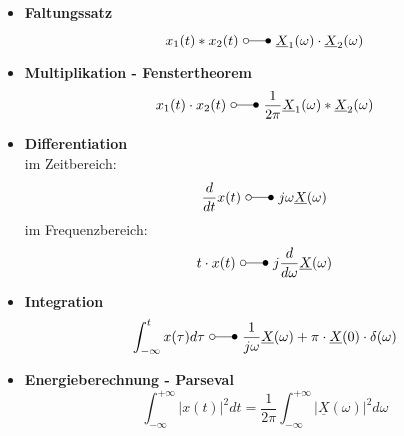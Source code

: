 \begin{mdframed}[style=exercise,nobreak=false]
\begin{itemize}
		\item \textbf{Faltungssatz}
		      \[
			      x_{1}(t) * x_{2}(t)\ \laplace\ \underline{X}_{1}(\omega) \cdot \underline{X}_{2}(\omega)
		      \]
		\item \textbf{Multiplikation - Fenstertheorem}
		      \[
			      x_{1}(t) \cdot x_{2}(t)\ \laplace\ \frac{1}{2 \pi} \underline{X}_{1}(\omega) * \underline{X}_{2}(\omega)
		      \]
		\item \textbf{Differentiation\\}
		      {\small im Zeitbereich:}
		      \[
			      \frac{d}{dt} x(t) \ \laplace\ j\omega\underline{X}(\omega)
		      \]
		      {\small im Frequenzbereich:}
		      \[
			      t \cdot x(t)\ \laplace\ j \frac{d}{d \omega} \underline{X}(\omega)
		      \]
		\item \textbf{Integration}
		      \[
			      \int_{-\infty}^{t} x(\tau) d \tau\ \laplace\ \frac{1}{j \omega} \underline{X}(\omega)+\pi \cdot \underline{X}(0) \cdot \delta(\omega)
		      \]
		\item \textbf{Energieberechnung - Parseval}
		      \[
			      \int_{-\infty}^{+\infty}|x(t)|^{2} d t=\frac{1}{2 \pi} \int_{-\infty}^{+\infty}|\underline{X}(\omega)|^{2} d \omega
		      \]
	\end{itemize}
\end{mdframed}
